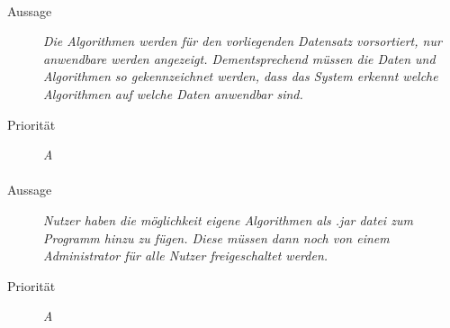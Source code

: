 \paragraph{}
\begin{description}
\item[Aussage] \textit{Die Algorithmen werden für den vorliegenden Datensatz vorsortiert, nur anwendbare werden angezeigt. Dementsprechend müssen die Daten und Algorithmen so gekennzeichnet werden, dass das System erkennt welche Algorithmen auf welche Daten anwendbar sind.}
\item[Priorität] \textit{A}
\end{description}

\paragraph{}
\begin{description}
\item[Aussage] \textit{Nutzer haben die möglichkeit eigene Algorithmen als .jar datei zum Programm hinzu zu fügen.
Diese müssen dann noch von einem Administrator für alle Nutzer freigeschaltet werden.}
\item[Priorität] \textit{A}
\end{description}


